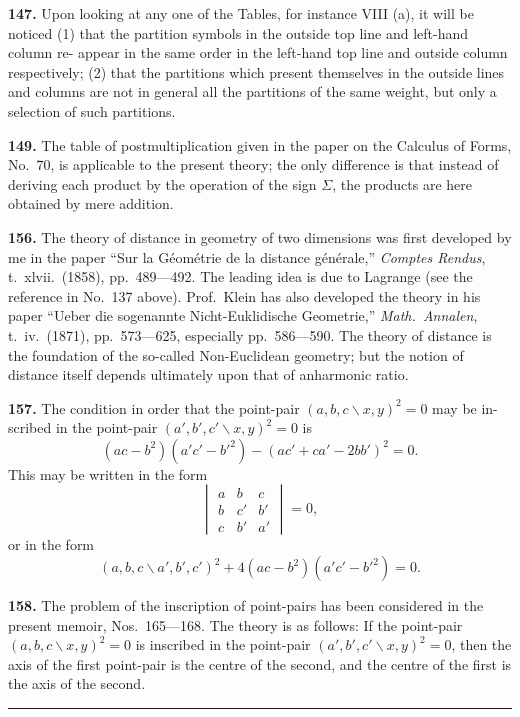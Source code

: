 \documentclass[11pt,a4paper]{book}
\begin{document}
\begin{center}
\textbf{147.} Upon looking at any one of the Tables, for instance VIII (a), it will be
noticed (1) that the partition symbols in the outside top line and left-hand column re-
appear in the same order in the left-hand top line and outside column respectively;
(2) that the partitions which present themselves in the outside lines and columns are
not in general all the partitions of the same weight, but only a selection of such
partitions.

\textbf{149.} The table of postmultiplication given in the paper on the Calculus of Forms,
No.~70, is applicable to the present theory; the only difference is that instead of
deriving each product by the operation of the sign $\Sigma$, the products are here obtained
by mere addition.

\textbf{156.} The theory of distance in geometry of two dimensions was first developed
by me in the paper ``Sur la G\'{e}om\'{e}trie de la distance g\'{e}n\'{e}rale,'' \textit{Comptes Rendus},
t.~xlvii.\ (1858), pp.~489---492. The leading idea is due to Lagrange (see the reference
in No.~137 above). Prof.\ Klein has also developed the theory in his paper ``Ueber die
sogenannte Nicht-Euklidische Geometrie,'' \textit{Math.\ Annalen}, t.\ iv.\ (1871), pp.~573---625,
especially pp.~586---590. The theory of distance is the foundation of the so-called
Non-Euclidean geometry; but the notion of distance itself depends ultimately upon that
of anharmonic ratio.

\textbf{157.} The condition in order that the point-pair $(a,b,c\!\backslash x,y)^2=0$ may be in-
scribed in the point-pair $(a',b',c'\!\backslash x,y)^2=0$ is
\[
(ac-b^2)(a'c'-b'^2)-(ac'+ca'-2bb')^2=0.
\]
This may be written in the form
\[
\begin{vmatrix}
a & b & c \\
b & c' & b' \\
c & b' & a'
\end{vmatrix} = 0,
\]
or in the form
\[
(a,b,c\!\backslash a',b',c')^2 + 4(ac-b^2)(a'c'-b'^2) = 0.
\]

\textbf{158.} The problem of the inscription of point-pairs has been considered in the
present memoir, Nos.~165---168. The theory is as follows: If the point-pair
$(a,b,c\!\backslash x,y)^2=0$ is inscribed in the point-pair $(a',b',c'\!\backslash x,y)^2=0$, then the axis of the
first point-pair is the centre of the second, and the centre of the first is the axis of the
second.

\vspace{2em}
\begin{center}
\rule{0.5\textwidth}{0.4pt}
\end{center}


\end{center}
\end{document}
